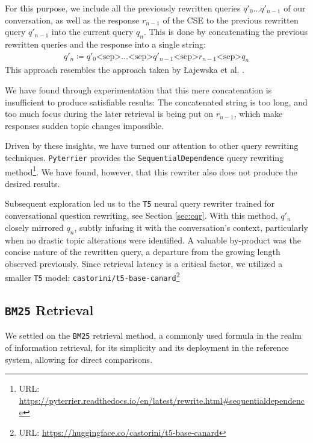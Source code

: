 \documentclass[sigconf]{acmart}
\begin{document}
For this purpose, we include all the previously rewritten queries $q'_0 \dots q'_{n-1}$ of our conversation, as well as the response $r_{n-1}$ of the CSE to the previous rewritten query $q'_{n-1}$ into the current query $q_n$. This is done by concatenating the previous rewritten queries and the response into a single string:
\begin{align*}
	q'_n \coloneqq q'_0 \text{<sep>} \dots \text{<sep>} q'_{n-1} \text{<sep>} r_{n-1} \text{<sep>} q_n
\end{align*}
This approach resembles the approach taken by Łajewska et al. \cite{Lajewska:2023:ECIR}.

We have found through experimentation that this mere concatenation is insufficient to produce satisfiable results: The concatenated string is too long, and too much focus during the later retrieval is being put on $r_{n-1}$, which make responses sudden topic changes impossible.

Driven by these insights, we have turned our attention to other query rewriting techniques. \texttt{Pyterrier} provides the \texttt{Sequential\-Dependence} query rewriting method\footnote{URL: \url{https://pyterrier.readthedocs.io/en/latest/rewrite.html\#sequentialdependence}}. We have found, however, that this rewriter also does not produce the desired results.

Subsequent exploration led us to the \texttt{T5} neural query rewriter trained for conversational question rewriting, see Section \ref{sec:cqr}. With this method, $q'_n$ closely mirrored $q_n$, subtly infusing it with the conversation's context, particularly when no drastic topic alterations were identified. A valuable by-product was the concise nature of the rewritten query, a departure from the growing length observed previously. Since retrieval latency is a critical factor, we utilized a smaller \texttt{T5} model: \texttt{castorini\-/t5\--base\--canard}\footnote{URL: \url{https://huggingface.co/castorini/t5-base-canard}}

\subsection{\texttt{BM25} Retrieval}
We settled on the \texttt{BM25} retrieval method, a commonly used formula in the realm of information retrieval, for its simplicity and its deployment in the reference system, allowing for direct comparisons.
\end{document}
